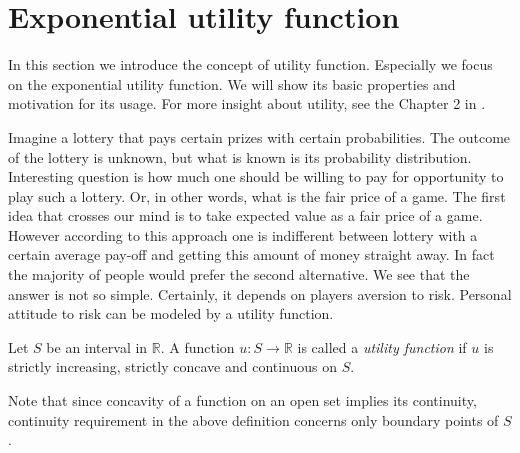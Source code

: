 \vspace{4 mm}
\section{Exponential utility function}
\vspace{2 mm}


In this section we introduce the concept of utility function. Especially we focus on the exponential utility function. We will show its basic properties and motivation for its usage. For more insight about utility, see the Chapter 2 in \cite{Portfolio}.

Imagine a lottery that pays certain prizes with certain probabilities. The outcome of the lottery is unknown, but what is known is its probability distribution. Interesting question is how much one should be willing to pay for opportunity to play such a lottery. Or, in other words, what is the fair price of a game. The first idea that crosses our mind is to take expected value as a fair price of a game. However according to this approach one is indifferent between lottery with a certain average pay-off and getting this amount of money straight away. In fact the majority of people would prefer the second alternative. %
We see that the answer is not so simple. Certainly, it depends on players aversion to risk. Personal attitude to risk can be modeled by a utility function. %
\begin{df} Let $S$ be an interval in $\mathbb{R}$. A function $u:S\to\mathbb{R}$ is called a \textit{utility function} if $u$ is strictly increasing, strictly concave and continuous on $S$.
\end{df}
\noindent Note that since concavity of a function on an open set implies its continuity, continuity requirement in the above definition concerns only boundary points of $S$.

